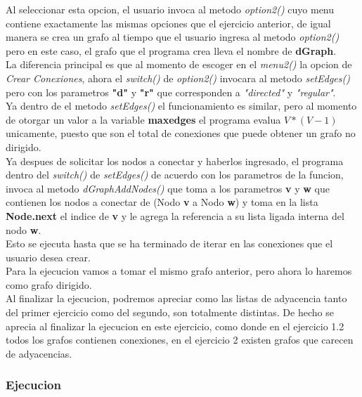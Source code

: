 \documentclass{article}
\begin{document}
				Al seleccionar esta opcion, el usuario invoca al metodo \emph{option2()} cuyo menu contiene exactamente las mismas opciones que el ejercicio anterior, de igual manera se crea un grafo al tiempo que el usuario ingresa al metodo \emph{option2()} pero en este caso, el grafo que el programa crea lleva el nombre de \textbf{dGraph}.\\
				
				La diferencia principal es que al momento de escoger en el \emph{menu2()} la opcion de \textit{Crear Conexiones}, ahora el \textit{switch()} de \emph{option2()} invocara al metodo \emph{setEdges()} pero con los parametros \textbf{"d"} y \textbf{"r"} que corresponden a \textit{"directed"} y \textit{"regular"}.\\
				
				Ya dentro de el metodo \emph{setEdges()} el funcionamiento es similar, pero al momento de otorgar un valor a la variable \textbf{maxedges} el programa evalua $V*(V - 1)$ unicamente, puesto que son el total de conexiones que puede obtener un grafo no dirigido.\\
				
				Ya despues de solicitar los nodos a conectar y haberlos ingresado, el programa dentro del \textit{switch()} de \emph{setEdges()} de acuerdo con los parametros de la funcion, invoca al metodo \emph{dGraphAddNodes()} que toma a los parametros \textbf{v} y \textbf{w} que contienen los nodos a conectar de (Nodo \textbf{v} a Nodo \textbf{w}) y toma en la lista \textbf{Node.next} el indice de \textbf{v} y le agrega la referencia a su lista ligada interna del nodo \textbf{w}.\\
				
				Esto se ejecuta hasta que se ha terminado de iterar en las conexiones que el usuario desea crear.\\
				
				Para la ejecucion vamos a tomar el mismo grafo anterior, pero ahora lo haremos como grafo dirigido.\\
				
				Al finalizar la ejecucion, podremos apreciar como las listas de adyacencia tanto del primer ejercicio como del segundo, son totalmente distintas. De hecho se aprecia al finalizar la ejecucion en este ejercicio, como donde en el ejercicio 1.2 todos los grafos contienen conexiones, en el ejercicio 2 existen grafos que carecen de adyacencias.
				
			\subsubsection{Ejecucion}
			
\end{document}
